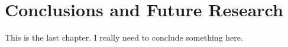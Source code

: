 %
%
%
% 
%

\chapter{Conclusions and Future Research}
\label{ConclusionsAndFutureResearch}

\indent This is the last chapter.
I really need to conclude something here.

